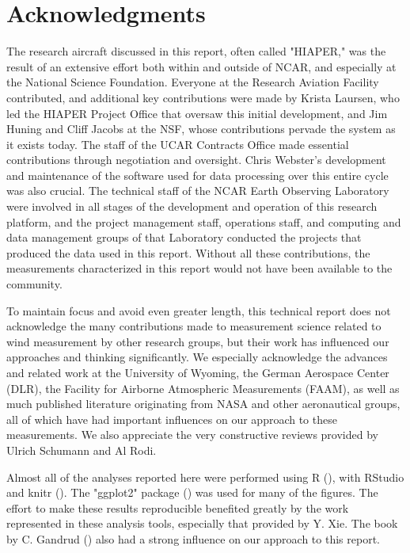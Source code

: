 \documentclass[12pt,twoside,english]{article}\usepackage[]{graphicx}\usepackage[]{color}
\let\stdsection\section
\renewcommand{\section}{\newpage\stdsection}
\begin{document}
\section*{Acknowledgments}
\label{sec:acknowledgements}

The research aircraft discussed in this report, often called "HIAPER," was the result of an extensive effort both within and outside of NCAR, and especially at the National Science Foundation. Everyone at the Research Aviation Facility contributed, and additional key contributions were made by Krista Laursen, who led the HIAPER Project Office that oversaw this initial development, and Jim Huning and Cliff Jacobs at the NSF, whose contributions pervade the system as it exists today. The staff of the UCAR Contracts Office made essential contributions through negotiation and oversight. Chris Webster's development and maintenance of the software used for data processing over this entire cycle was also crucial. The technical staff of the NCAR Earth Observing Laboratory were involved in all stages of the development and operation of this research platform, and the project management staff, operations staff, and computing and data management groups of that Laboratory conducted the projects that produced the data used in this report. Without all these contributions, the measurements characterized in this report would not have been available to the community.

To maintain focus and avoid even greater length, this technical report does not acknowledge the many contributions made to measurement science related to wind measurement by other research groups, but their work has influenced our approaches and thinking significantly. We especially acknowledge the advances and related work at the University of Wyoming, the German Aerospace Center (DLR), the Facility for Airborne Atmospheric Measurements (FAAM), as well as much published literature originating from NASA and other aeronautical groups, all of which have had important influences on our approach to these measurements. We also appreciate the very constructive reviews provided by Ulrich Schumann and Al Rodi.

Almost all of the analyses reported here were performed using R (\citet{Rlanguage}), with RStudio  \citet{RStudio2012} and knitr (\citet{Xie2014a,Xie2014b}). The
"ggplot2" package (\citet{wickham2009}) was used for many of the figures. The effort to make these results reproducible benefited greatly by the work represented in these analysis tools, especially that provided by Y. Xie. The book by C. Gandrud (\citet{Gandrud2014}) also had a strong influence on our approach to this report.
\end{document}
